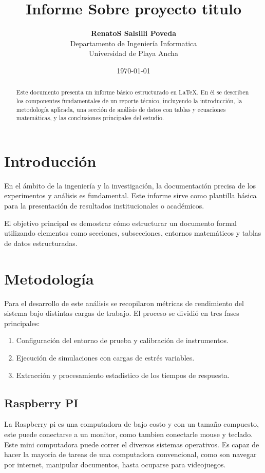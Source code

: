 \documentclass[11pt, a4paper]{article}
\title{\textbf{Informe Sobre proyecto titulo}}
\author{\textbf{RenatoS Salsilli Poveda} \\ Departamento de Ingeniería Informatica \\ Universidad de Playa Ancha}
\date{\today}
\begin{document}
\maketitle

\newpage

\begin{abstract}
Este documento presenta un informe básico estructurado en \LaTeX{}. En él se describen los componentes fundamentales de un reporte técnico, incluyendo la introducción, la metodología aplicada, una sección de análisis de datos con tablas y ecuaciones matemáticas, y las conclusiones principales del estudio.
\end{abstract}

\newpage

\section{Introducción}
En el ámbito de la ingeniería y la investigación, la documentación precisa de los experimentos y análisis es fundamental. Este informe sirve como plantilla básica para la presentación de resultados institucionales o académicos.

El objetivo principal es demostrar cómo estructurar un documento formal utilizando elementos como secciones, subsecciones, entornos matemáticos y tablas de datos estructuradas.

\section{Metodología}
Para el desarrollo de este análisis se recopilaron métricas de rendimiento del sistema bajo distintas cargas de trabajo. El proceso se dividió en tres fases principales:
\begin{enumerate}
    \item Configuración del entorno de prueba y calibración de instrumentos.
    \item Ejecución de simulaciones con cargas de estrés variables.
    \item Extracción y procesamiento estadístico de los tiempos de respuesta.
\end{enumerate}

\subsection{Raspberry PI}
La Raspberry pi es una computadora de bajo costo y con un tamaño compuesto, este puede conectarse a un monitor, como tambien conectarle mouse y teclado. Este mini computadora puede correr el diversos sistemas operativos. Es capaz de hacer la mayoria de tareas de una computadora convencional, como son navegar por internet, manipular documentos, hasta ocuparse para videojuegos.
\end{document}
